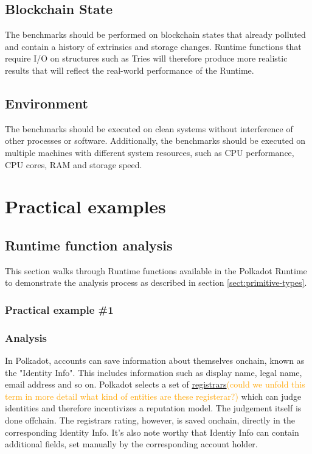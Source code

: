 \documentclass[11pt,a4paper]{article}
\newcommand{\syed}[2]{{\underline{#1}}\textcolor{orange}{(#2)}}
\begin{document}
\subsection{Blockchain State}
The benchmarks should be performed on blockchain states that already polluted
and contain a history of extrinsics and storage changes. Runtime functions that
require I/O on structures such as Tries will therefore produce more realistic
results that will reflect the real-world performance of the Runtime.

\subsection{Environment}
The benchmarks should be executed on clean systems without interference of other
processes or software. Additionally, the benchmarks should be executed on
multiple machines with different system resources, such as CPU performance, CPU
cores, RAM and storage speed.

\section{Practical examples}\label{sec:practical-examples}

\subsection{Runtime function analysis}

This section walks through Runtime functions available in the Polkadot Runtime
to demonstrate the analysis process as described in section
\ref{sect:primitive-types}.

\subsubsection{Practical example \#1}

\subsubsection*{Analysis}

In Polkadot, accounts can save information about themselves onchain, known as
the "Identity Info". This includes information such as display name, legal name,
email address and so on. Polkadot selects a set of \syed{registrars}{could we unfold this term in more detail what kind of entities are these registerar?} which can judge 
identities and therefore incentivizes a reputation model. The judgement itself
is done offchain. The registrars rating, however, is saved onchain, directly in
the corresponding Identity Info. It's also note worthy that Identiy Info can
contain additional fields, set manually by the corresponding account holder.
\newline
\end{document}
